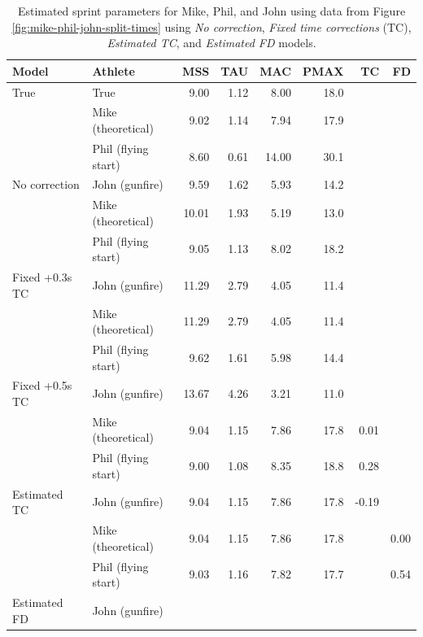 \documentclass[fleqn,10pt,lineno]{wlpeerj} %
\begin{document}
\begin{table}

\caption{\label{tab:all-estimates}Estimated sprint parameters for Mike, Phil, and John using data from Figure \ref{fig:mike-phil-john-split-times} using \emph{No correction}, \emph{Fixed time corrections} (TC), \emph{Estimated TC}, and \emph{Estimated FD} models.}
\centering
\begin{tabular}[t]{llrrrrrr}
\toprule
Model & Athlete & MSS & TAU & MAC & PMAX & TC & FD\\
\midrule
True & True & 9.00 & 1.12 & 8.00 & 18.0 &  & \\
\cmidrule{1-8}
 & Mike (theoretical) & 9.02 & 1.14 & 7.94 & 17.9 &  & \\

 & Phil (flying start) & 8.60 & 0.61 & 14.00 & 30.1 &  & \\

\multirow{-3}{*}{\raggedright\arraybackslash No correction} & John (gunfire) & 9.59 & 1.62 & 5.93 & 14.2 &  & \\
\cmidrule{1-8}
 & Mike (theoretical) & 10.01 & 1.93 & 5.19 & 13.0 &  & \\

 & Phil (flying start) & 9.05 & 1.13 & 8.02 & 18.2 &  & \\

\multirow{-3}{*}{\raggedright\arraybackslash Fixed +0.3s TC} & John (gunfire) & 11.29 & 2.79 & 4.05 & 11.4 &  & \\
\cmidrule{1-8}
 & Mike (theoretical) & 11.29 & 2.79 & 4.05 & 11.4 &  & \\

 & Phil (flying start) & 9.62 & 1.61 & 5.98 & 14.4 &  & \\

\multirow{-3}{*}{\raggedright\arraybackslash Fixed +0.5s TC} & John (gunfire) & 13.67 & 4.26 & 3.21 & 11.0 &  & \\
\cmidrule{1-8}
 & Mike (theoretical) & 9.04 & 1.15 & 7.86 & 17.8 & 0.01 & \\

 & Phil (flying start) & 9.00 & 1.08 & 8.35 & 18.8 & 0.28 & \\

\multirow{-3}{*}{\raggedright\arraybackslash Estimated TC} & John (gunfire) & 9.04 & 1.15 & 7.86 & 17.8 & -0.19 & \\
\cmidrule{1-8}
 & Mike (theoretical) & 9.04 & 1.15 & 7.86 & 17.8 &  & 0.00\\

 & Phil (flying start) & 9.03 & 1.16 & 7.82 & 17.7 &  & 0.54\\

\multirow{-3}{*}{\raggedright\arraybackslash Estimated FD} & John (gunfire) &  &  &  &  &  & \\
\bottomrule
\end{tabular}
\end{table}
\end{document}
